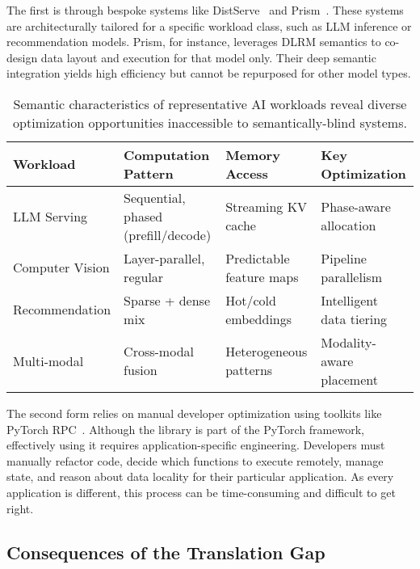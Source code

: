 The first is through bespoke systems like DistServe~\cite{distserve-2024} and Prism~\cite{prism-2025}. These systems are architecturally tailored for a specific workload class, such as LLM inference or recommendation models.
Prism, for instance, leverages DLRM semantics to co-design data layout and execution for that model only.
Their deep semantic integration yields high efficiency but cannot be repurposed for other model types.

\begin{table*}[t]
\centering
\small
\setlength{\tabcolsep}{4pt}
\begin{tabularx}{\linewidth}{@{} X l l l @{}}
\toprule
\textbf{Workload} & \textbf{Computation Pattern} & \textbf{Memory Access} & \textbf{Key Optimization} \\
\midrule
LLM Serving     & Sequential, phased (prefill/decode) & Streaming KV cache       & Phase-aware allocation \\
Computer Vision & Layer-parallel, regular             & Predictable feature maps & Pipeline parallelism \\
Recommendation  & Sparse + dense mix                  & Hot/cold embeddings      & Intelligent data tiering \\
Multi-modal     & Cross-modal fusion                  & Heterogeneous patterns   & Modality-aware placement \\
\bottomrule
\end{tabularx}
\caption{Semantic characteristics of representative AI workloads reveal diverse optimization opportunities inaccessible to semantically-blind systems.}
\label{tab:workload-characteristics}
\end{table*}

The second form relies on manual developer optimization using toolkits like PyTorch RPC~\cite{pytorchRPC}.
Although the library is part of the PyTorch framework, effectively using it requires application-specific engineering.
Developers must manually refactor code, decide which functions to execute remotely, manage state, and reason about data locality for their particular application.
As every application is different, this process can be time-consuming and difficult to get right.

\subsection{Consequences of the Translation Gap}
\label{sec:motiv:semantics-gap}

